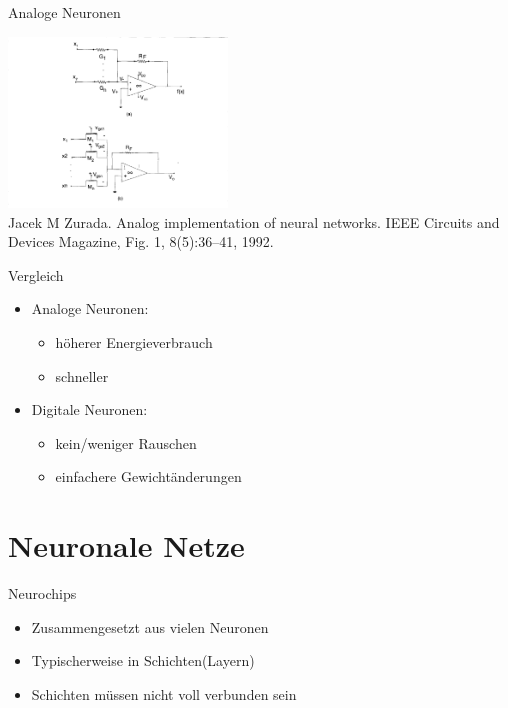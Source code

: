 \documentclass[handout]{beamer}
\begin{document}
    \begin{frame} {Analoge Neuronen}
        \begin{center}
            \includegraphics[width=220px]{../resources/analog-weights.png} \\
            \tiny Jacek M Zurada. Analog implementation of neural networks. IEEE
            Circuits and Devices Magazine, Fig. 1, 8(5):36–41, 1992.
        \end{center}
    \end{frame}

    \begin{frame} {Vergleich}
        \begin{itemize}
            \item Analoge Neuronen:
            \begin{itemize}
                \item höherer Energieverbrauch
                \item schneller
            \end{itemize}
            \item Digitale Neuronen:
            \begin{itemize}
                \item kein/weniger Rauschen
                \item einfachere Gewichtänderungen
            \end{itemize}
        \end{itemize}
    \end{frame}

    \section{Neuronale Netze}

    \begin{frame} {Neurochips}
        \begin{itemize}
            \item Zusammengesetzt aus vielen Neuronen
            \item Typischerweise in Schichten(Layern)
            \item Schichten müssen nicht voll verbunden sein
        \end{itemize}
    \end{frame}
\end{document}
